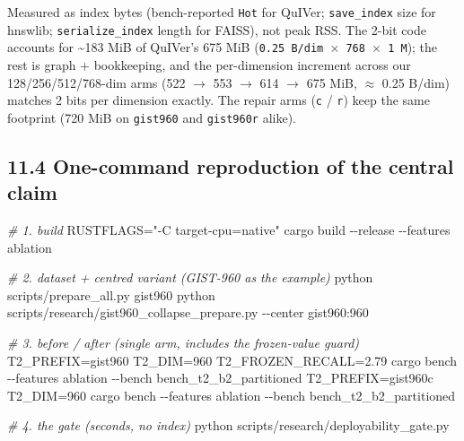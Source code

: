 \documentclass[
  10pt,
]{article}
\newenvironment{Shaded}{}{}
\newcommand{\AttributeTok}[1]{\textcolor[rgb]{0.49,0.56,0.16}{#1}}
\newcommand{\CommentTok}[1]{\textcolor[rgb]{0.38,0.63,0.69}{\textit{#1}}}
\newcommand{\ExtensionTok}[1]{#1}
\newcommand{\NormalTok}[1]{#1}
\newcommand{\OperatorTok}[1]{\textcolor[rgb]{0.40,0.40,0.40}{#1}}
\newcommand{\StringTok}[1]{\textcolor[rgb]{0.25,0.44,0.63}{#1}}
\newcommand{\VariableTok}[1]{\textcolor[rgb]{0.10,0.09,0.49}{#1}}
\begin{document}
Measured as index bytes (bench-reported \texttt{Hot} for QuIVer;
\texttt{save\_index} size for hnswlib; \texttt{serialize\_index} length
for FAISS), not peak RSS. The 2-bit code accounts for \textasciitilde183
MiB of QuIVer's 675 MiB (\texttt{0.25\ B/dim\ $\times$\ 768\ $\times$\ 1\ M}); the
rest is graph + bookkeeping, and the per-dimension increment across our
128/256/512/768-dim arms (522 $\rightarrow$ 553 $\rightarrow$ 614 $\rightarrow$ 675 MiB, $\approx$ 0.25 B/dim)
matches 2 bits per dimension exactly. The repair arms (\texttt{c} /
\texttt{r}) keep the same footprint (720 MiB on \texttt{gist960} and
\texttt{gist960r} alike).

\subsection{11.4 One-command reproduction of the central
claim}\label{one-command-reproduction-of-the-central-claim}

\begin{Shaded}
\begin{Highlighting}[]
\CommentTok{\# 1. build}
\VariableTok{RUSTFLAGS}\OperatorTok{=}\StringTok{"{-}C target{-}cpu=native"} \ExtensionTok{cargo}\NormalTok{ build }\AttributeTok{{-}{-}release} \AttributeTok{{-}{-}features}\NormalTok{ ablation}

\CommentTok{\# 2. dataset + centred variant (GIST{-}960 as the example)}
\ExtensionTok{python}\NormalTok{ scripts/prepare\_all.py gist960}
\ExtensionTok{python}\NormalTok{ scripts/research/gist960\_collapse\_prepare.py }\AttributeTok{{-}{-}center}\NormalTok{ gist960:960}

\CommentTok{\# 3. before / after (single arm, includes the frozen{-}value guard)}
\VariableTok{T2\_PREFIX}\OperatorTok{=}\NormalTok{gist960  }\VariableTok{T2\_DIM}\OperatorTok{=}\NormalTok{960 }\VariableTok{T2\_FROZEN\_RECALL}\OperatorTok{=}\NormalTok{2.79 }\ExtensionTok{cargo}\NormalTok{ bench }\AttributeTok{{-}{-}features}\NormalTok{ ablation }\AttributeTok{{-}{-}bench}\NormalTok{ bench\_t2\_b2\_partitioned}
\VariableTok{T2\_PREFIX}\OperatorTok{=}\NormalTok{gist960c }\VariableTok{T2\_DIM}\OperatorTok{=}\NormalTok{960 }\ExtensionTok{cargo}\NormalTok{ bench }\AttributeTok{{-}{-}features}\NormalTok{ ablation }\AttributeTok{{-}{-}bench}\NormalTok{ bench\_t2\_b2\_partitioned}

\CommentTok{\# 4. the gate (seconds, no index)}
\ExtensionTok{python}\NormalTok{ scripts/research/deployability\_gate.py}
\end{Highlighting}
\end{Shaded}
\end{document}
